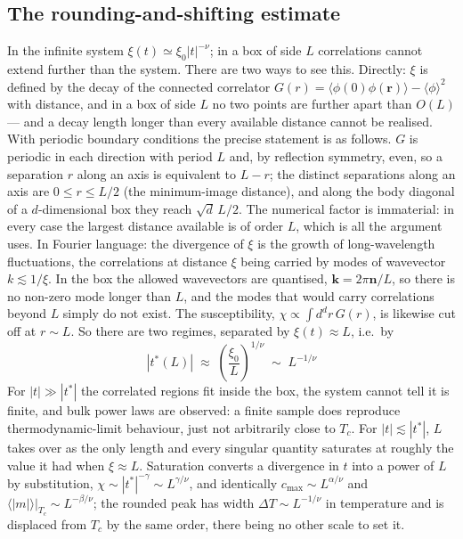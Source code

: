 \documentclass[10pt,a4paper]{article}
\theoremstyle{remark}
\begin{document}
\subsection{The rounding-and-shifting estimate}
\label{sec:fss:estimate}
In the infinite system $\xi(t)\simeq\xi_0|t|^{-\nu}$; in a box of side $L$
correlations cannot extend further than the system. There are two ways to see
this. Directly: $ \xi $ is defined by the decay of the connected correlator
$ G(r) = \langle\phi(0)\phi(\mathbf{r})\rangle - \langle\phi\rangle^{2} $ with
distance, and in a box of side $ L $ no two points are further apart than $ O(L) $
--- and a decay length longer than every available distance cannot be realised.
With periodic boundary conditions the precise statement is as follows. $ G $ is
periodic in each direction with period $ L $ and, by reflection symmetry, even,
so a separation $ r $ along an axis is equivalent to $ L - r $; the distinct
separations along an axis are $ 0 \leq r \leq L/2 $ (the minimum-image distance),
and along the body diagonal of a $ d $-dimensional box they reach $ \sqrt{d}\,L/2 $.
The numerical factor is immaterial: in every case the largest distance available
is of order $ L $, which is all the argument uses. In Fourier
language: the divergence of $ \xi $ is the growth of long-wavelength fluctuations,
the correlations at distance $ \xi $ being carried by modes of wavevector
$ k \lesssim 1/\xi $. In the box the allowed wavevectors are quantised,
$ \mathbf{k} = 2\pi\mathbf{n}/L $, so there is no non-zero mode longer than $ L $,
and the modes that would carry correlations beyond $ L $ simply do not exist. The
susceptibility, $ \chi \propto \int d^{d}r\, G(r) $, is likewise cut off at
$ r \sim L $. So there are two regimes, separated by $\xi(t)\approx L$, i.e.\ by
\[
\;|t^{\ast}(L)|\;\approx\;\left(\frac{\xi_0}{L}\right)^{1/\nu}
\;\sim\;L^{-1/\nu}\
\]
For $|t|\gg|t^{\ast}|$ the correlated regions fit inside the box, the system
cannot tell it is finite, and bulk power laws are observed: a finite sample does
reproduce thermodynamic-limit behaviour, just not arbitrarily close to $T_c$. For
$|t|\lesssim|t^{\ast}|$, $L$ takes over as the only length and every singular
quantity saturates at roughly the value it had when $\xi\approx L$. Saturation
converts a divergence in $t$ into a power of $L$ by substitution,
$\chi\sim|t^{\ast}|^{-\gamma}\sim L^{\gamma/\nu}$, and identically
$c_{\max}\sim L^{\alpha/\nu}$ and
$\langle|m|\rangle\big|_{T_c}\sim L^{-\beta/\nu}$; the rounded peak has width
$\Delta T\sim L^{-1/\nu}$ in temperature and is displaced from $T_c$ by the same
order, there being no other scale to set it.
\end{document}
